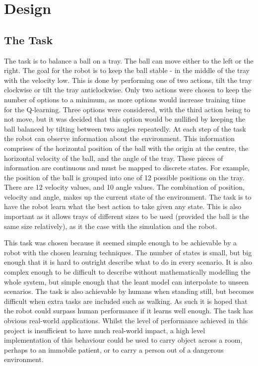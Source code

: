 \documentclass[12pt,a4paper]{article}
\begin{document}
\section{Design}

\subsection{The Task}
The task is to balance a ball on a tray. The ball can move either to the left or the right. The goal for the robot is to keep the ball stable - in the middle of the tray with the velocity low. This is done by performing one of two actions, tilt the tray clockwise or tilt the tray anticlockwise. Only two actions were chosen to keep the number of options to a minimum, as more options would increase training time for the Q-learning. Three options were considered, with the third action being to not move, but it was decided that this option would be nullified by keeping the ball balanced by tilting between two angles repeatedly. At each step of the task the robot can observe information about the environment. This information comprises of the horizontal position of the ball with the origin at the centre, the horizontal velocity of the ball, and the angle of the tray. These pieces of information are continuous and must be mapped to discrete states. For example, the position of the ball is grouped into one of 12 possible positions on the tray. There are 12 velocity values, and 10 angle values. The combination of position, velocity and angle, makes up the current state of the environment. The task is to have the robot learn what the best action to take given any state. This is also important as it allows trays of different sizes to be used (provided the ball is the same size relatively), as it the case with the simulation and the robot. 

This task was chosen because it seemed simple enough to be achievable by a robot with the chosen learning techniques. The number of states is small, but big enough that it is hard to outright describe what to do in every scenario. It is also complex enough to be difficult to describe without mathematically modelling the whole system, but simple enough that the leant model can interpolate to unseen scenarios. The task is also achievable by humans when standing still, but becomes difficult when extra tasks are included such as walking. As such it is hoped that the robot could surpass human performance if it learns well enough. The task has obvious real-world applications. Whilst the level of performance achieved in this project is insufficient to have much real-world impact, a high level implementation of this behaviour could be used to carry object across a room, perhaps to an immobile patient, or to carry a person out of a dangerous environment.
\end{document}

